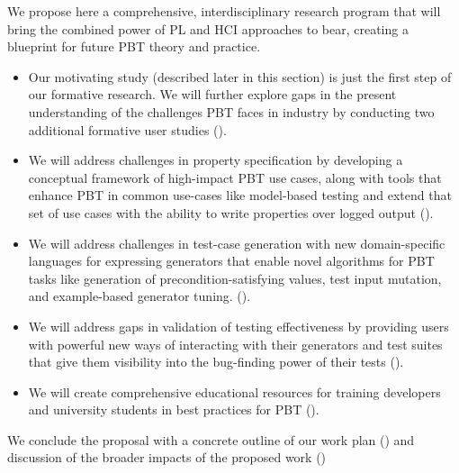 We propose here a comprehensive, interdisciplinary research program that will
bring the combined power of PL and HCI approaches to bear, creating a
blueprint for future PBT theory and practice.
\iflater{}\fi
\begin{itemize}[noitemsep]
  \item
  Our motivating study (described later in this section) is just the first step
  of our formative research.
  We will further explore gaps in the present understanding of the
  challenges PBT faces in
  industry by conducting two\iflater{}\fi{} additional formative user
  studies ().
  \item We will address challenges in property specification by developing a
  conceptual framework of high-impact PBT use cases, along with tools that
  enhance PBT in common use-cases like model-based testing and extend that set
  of use cases with the ability to write properties over logged output ().
  \item We will address challenges in test-case generation with new
  domain-specific languages for expressing generators that enable novel
  algorithms for PBT tasks like generation of precondition-satisfying values,
  test input mutation, and example-based generator tuning.
  ().
  \item We will address gaps in validation of testing effectiveness by providing
  users with powerful new ways of interacting with their generators and test
  suites that give them visibility into the bug-finding power of their tests
  ().
  \item We will create comprehensive educational resources for training developers and
  university students in best practices for PBT ().
\end{itemize}
We conclude the proposal with a concrete outline of our work plan
() and discussion of the broader impacts of the
proposed work ()

